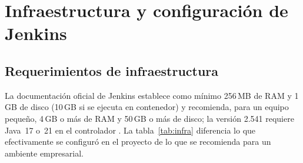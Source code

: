 \documentclass[11pt,a4paper]{article}
\begin{document}
\section{Infraestructura y configuración de Jenkins}
\label{sec:infra}

\subsection{Requerimientos de infraestructura}

La documentación oficial de Jenkins establece como mínimo 256\,MB de RAM y 1\,GB de disco (10\,GB
si se ejecuta en contenedor) y recomienda, para un equipo pequeño, 4\,GB o más de RAM y 50\,GB o más
de disco; la versión 2.541 requiere Java~17 o~21 en el controlador \cite{jenkins-docker}. La
tabla~\ref{tab:infra} diferencia lo que efectivamente se configuró en el proyecto de lo que se
recomienda para un ambiente empresarial.
\end{document}
